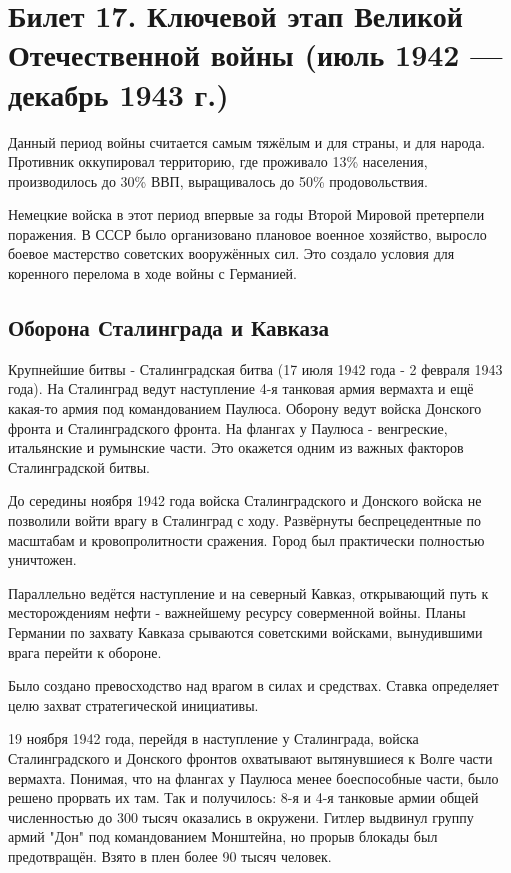 \section{Билет 17. Ключевой этап Великой Отечественной войны (июль 1942 — декабрь 1943 г.)}

Данный период войны считается самым тяжёлым и для страны, и для народа.
Противник оккупировал территорию, где проживало 13\% населения, производилось до 30\% ВВП, выращивалось до 50\% продовольствия.

Немецкие войска в этот период впервые за годы Второй Мировой претерпели поражения.
В СССР было организовано плановое военное хозяйство, выросло боевое мастерство советских вооружённых сил. Это создало условия для коренного перелома в ходе войны с Германией.

\subsection{Оборона Сталинграда и Кавказа}

Крупнейшие битвы - Сталинградская битва (17 июля 1942 года - 2 февраля 1943 года). На Сталинград ведут наступление 4-я танковая армия вермахта и ещё какая-то армия под командованием Паулюса. Оборону ведут войска Донского фронта и Сталинградского фронта.
На флангах у Паулюса - венгреские, итальянские и румынские части. Это окажется одним из важных факторов Сталинградской битвы.

До середины ноября 1942 года войска Сталинградского и Донского войска не позволили войти врагу в Сталинград с ходу. Развёрнуты беспрецедентные по масштабам и кровопролитности сражения. Город был практически полностью уничтожен.

Параллельно ведётся наступление и на северный Кавказ, открывающий путь к месторождениям нефти - важнейшему ресурсу соверменной войны. Планы Германии по захвату Кавказа срываются советскими войсками, вынудившими врага перейти к обороне.

Было создано превосходство над врагом в силах и средствах. Ставка определяет целю захват стратегической инициативы.

19 ноября 1942 года, перейдя в наступление у Сталинграда, войска Сталинградского и Донского фронтов охватывают вытянувшиеся к Волге части вермахта. Понимая, что на флангах у Паулюса менее боеспособные части, было решено прорвать их там. Так и получилось: 8-я и 4-я танковые армии общей численностью до 300 тысяч оказались в окружени. Гитлер выдвинул группу армий "Дон" под командованием Монштейна, но прорыв блокады был предотвращён. Взято в плен более 90 тысяч человек.

